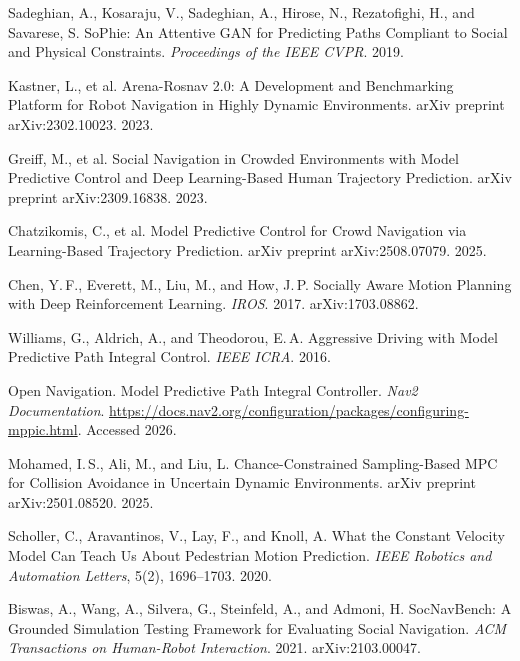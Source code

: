 \documentclass[12pt, a4paper]{article}
\begin{document}
\begin{enumerate}[label={[\arabic*]}, leftmargin=*, itemsep=4pt]
\item Sadeghian, A., Kosaraju, V., Sadeghian, A., Hirose, N., Rezatofighi, H., and Savarese, S. SoPhie: An Attentive GAN for Predicting Paths Compliant to Social and Physical Constraints. \textit{Proceedings of the IEEE CVPR}. 2019.

\item Kastner, L., et al. Arena-Rosnav 2.0: A Development and Benchmarking Platform for Robot Navigation in Highly Dynamic Environments. arXiv preprint arXiv:2302.10023. 2023.

\item Greiff, M., et al. Social Navigation in Crowded Environments with Model Predictive Control and Deep Learning-Based Human Trajectory Prediction. arXiv preprint arXiv:2309.16838. 2023.

\item Chatzikomis, C., et al. Model Predictive Control for Crowd Navigation via Learning-Based Trajectory Prediction. arXiv preprint arXiv:2508.07079. 2025.

\item Chen, Y.\,F., Everett, M., Liu, M., and How, J.\,P. Socially Aware Motion Planning with Deep Reinforcement Learning. \textit{IROS}. 2017. arXiv:1703.08862.

\item Williams, G., Aldrich, A., and Theodorou, E.\,A. Aggressive Driving with Model Predictive Path Integral Control. \textit{IEEE ICRA}. 2016.

\item Open Navigation. Model Predictive Path Integral Controller. \textit{Nav2 Documentation}. \url{https://docs.nav2.org/configuration/packages/configuring-mppic.html}. Accessed 2026.

\item Mohamed, I.\,S., Ali, M., and Liu, L. Chance-Constrained Sampling-Based MPC for Collision Avoidance in Uncertain Dynamic Environments. arXiv preprint arXiv:2501.08520. 2025.

\item Scholler, C., Aravantinos, V., Lay, F., and Knoll, A. What the Constant Velocity Model Can Teach Us About Pedestrian Motion Prediction. \textit{IEEE Robotics and Automation Letters}, 5(2), 1696--1703. 2020.

\item Biswas, A., Wang, A., Silvera, G., Steinfeld, A., and Admoni, H. SocNavBench: A Grounded Simulation Testing Framework for Evaluating Social Navigation. \textit{ACM Transactions on Human-Robot Interaction}. 2021. arXiv:2103.00047.


\end{enumerate}
\end{document}
